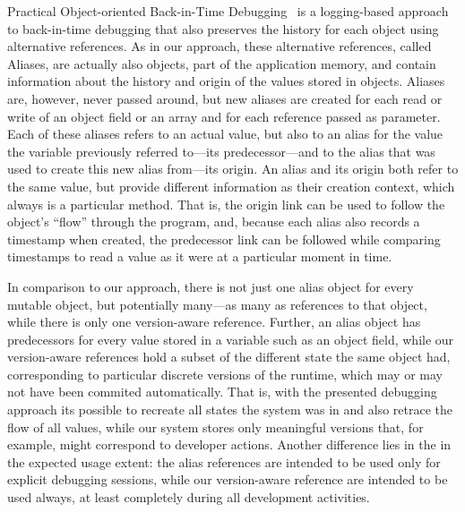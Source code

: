Practical Object-oriented Back-in-Time Debugging~\cite{Lienhard2008POB} is a logging-based approach to back-in-time debugging that also preserves the history for each object using alternative references.
As in our approach, these alternative references, called Aliases, are actually also objects, part of the application memory, and contain information about the history and origin of the values stored in objects.
Aliases are, however, never passed around, but new aliases are created for each read or write of an object field or an array and for each reference passed as parameter.
Each of these aliases refers to an actual value, but also to an alias for the value the variable previously referred to---its predecessor---and to the alias that was used to create this new alias from---its origin.
An alias and its origin both refer to the same value, but provide different information as their creation context, which always is a particular method.
That is, the origin link can be used to follow the object's ``flow'' through the program, and, because each alias also records a timestamp when created, the predecessor link can be followed while comparing timestamps to read a value as it were at a particular moment in time.

In comparison to our approach, there is not just one alias object for every mutable object, but potentially many---as many as references to that object, while there is only one version-aware reference.
Further, an alias object has predecessors for every value stored in a variable such as an object field, while our version-aware references hold a subset of the different state the same object had, corresponding to particular discrete versions of the runtime, which may or may not have been commited automatically.
That is, with the presented debugging approach its possible to recreate all states the system was in and also retrace the flow of all values, while our system stores only meaningful versions that, for example, might correspond to developer actions.
Another difference lies in the in the expected usage extent: the alias references are intended to be used only for explicit debugging sessions, while our version-aware reference are intended to be used always, at least completely during all development activities.

